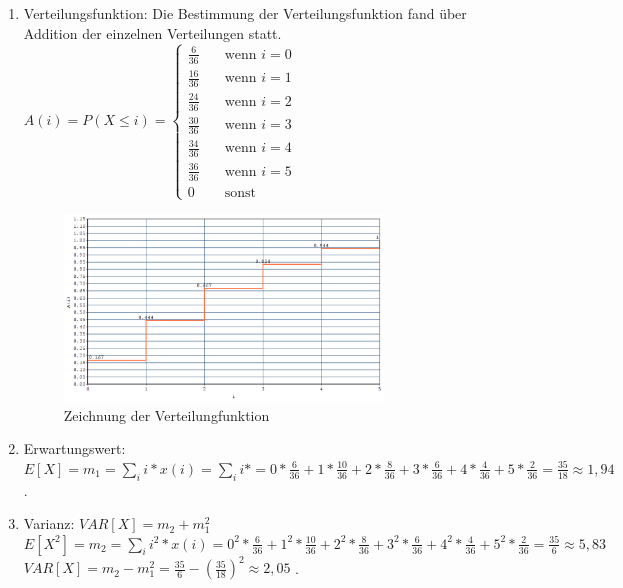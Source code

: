 \documentclass[%
10pt,              %
ngerman,           %
a4paper,           %
DIV11,             %
]{scrartcl}%
\begin{document}
\begin{enumerate}
	\item Verteilungsfunktion: Die Bestimmung der Verteilungsfunktion fand über Addition der einzelnen Verteilungen statt.\newline
	$A(i) = P(X \leq i) = 
    \begin{cases}
        \frac{6}{36}& \quad \text{wenn } i = 0\\
        \frac{16}{36} & \quad \text{wenn } i = 1\\
        \frac{24}{36} & \quad \text{wenn } i = 2\\
        \frac{30}{36} & \quad \text{wenn } i = 3\\
        \frac{34}{36} & \quad \text{wenn } i = 4\\
        \frac{36}{36} & \quad \text{wenn } i = 5\\
        0 & \quad \text{sonst}
    \end{cases}
    $
    \begin{figure}[!htbp]
      \centering
        \caption{Zeichnung der Verteilungfunktion}
        \includegraphics[width=0.8\textwidth]{xdiff1vertfkt}
    \end{figure}
	
	\item Erwartungswert: $E[X] = m_1 = \sum_{i}i * x(i) = \sum_{i}i * = 0 * \frac{6}{36} + 1 * \frac{10}{36} + 2 * \frac{8}{36} + 3 * \frac{6}{36} + 4 * \frac{4}{36} + 5 * \frac{2}{36} = \frac{35}{18} \approx 1,94$.
	\item Varianz: $VAR[X] = m_2 + m_1^2$\newline
	$E[X^2] = m_2 = \sum_{i}i^2 * x(i) = 0^2 * \frac{6}{36} + 1^2 * \frac{10}{36} + 2^2 * \frac{8}{36} + 3^2 * \frac{6}{36} + 4^2 * \frac{4}{36} + 5^2 * \frac{2}{36} = \frac{35}{6} \approx 5,83$
    \\
    $VAR[X] = m_2 - m_1^2 = \frac{35}{6} - (\frac{35}{18})^2 \approx 2,05$ .
\end{enumerate}
\end{document}
